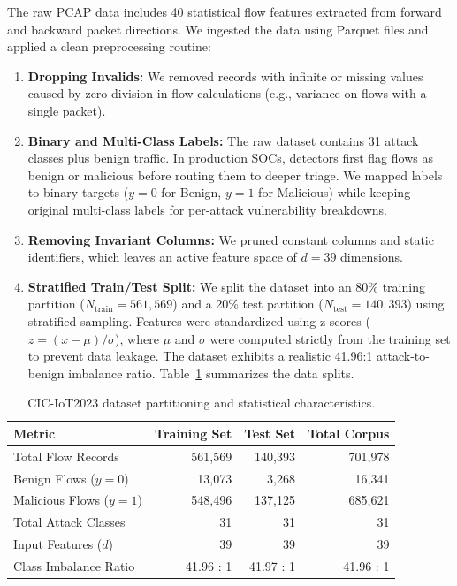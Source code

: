 \documentclass[final,5p,times,twocolumn]{elsarticle}
\begin{document}
The raw PCAP data includes 40 statistical flow features extracted from forward and backward packet directions. We ingested the data using Parquet files and applied a clean preprocessing routine:
\begin{enumerate}
    \item \textbf{Dropping Invalids:} We removed records with infinite or missing values caused by zero-division in flow calculations (e.g., variance on flows with a single packet).
    \item \textbf{Binary and Multi-Class Labels:} The raw dataset contains 31 attack classes plus benign traffic. In production SOCs, detectors first flag flows as benign or malicious before routing them to deeper triage. We mapped labels to binary targets ($y=0$ for Benign, $y=1$ for Malicious) while keeping original multi-class labels for per-attack vulnerability breakdowns.
    \item \textbf{Removing Invariant Columns:} We pruned constant columns and static identifiers, which leaves an active feature space of $d=39$ dimensions.
    \item \textbf{Stratified Train/Test Split:} We split the dataset into an 80\% training partition ($N_{\text{train}} = 561,569$) and a 20\% test partition ($N_{\text{test}} = 140,393$) using stratified sampling. Features were standardized using z-scores ($z = (x - \mu)/\sigma$), where $\mu$ and $\sigma$ were computed strictly from the training set to prevent data leakage. The dataset exhibits a realistic 41.96:1 attack-to-benign imbalance ratio. Table~\ref{tab:dataset_stats} summarizes the data splits.
\end{enumerate}

\begin{table}[t]
\centering
\small
\caption{CIC-IoT2023 dataset partitioning and statistical characteristics.}
\label{tab:dataset_stats}
\begin{tabular*}{\textwidth}{@{\extracolsep{\fill}}lrrr}
\toprule
\textbf{Metric} & \textbf{Training Set} & \textbf{Test Set} & \textbf{Total Corpus} \\
\midrule
Total Flow Records & 561,569 & 140,393 & 701,978 \\
Benign Flows ($y=0$) & 13,073 & 3,268 & 16,341 \\
Malicious Flows ($y=1$) & 548,496 & 137,125 & 685,621 \\
Total Attack Classes & 31 & 31 & 31 \\
Input Features ($d$) & 39 & 39 & 39 \\
Class Imbalance Ratio & 41.96 : 1 & 41.97 : 1 & 41.96 : 1 \\
\bottomrule
\end{tabular*}
\end{table}
\end{document}
